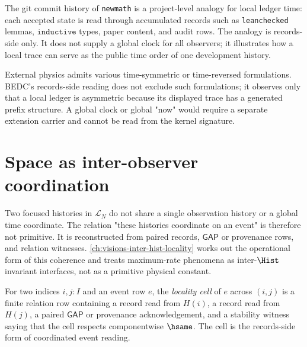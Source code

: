 \begin{example}
\label{ex:consciousness-universe-commit-history-time}
The git commit history of \texttt{newmath} is a project-level analogy for local ledger time: each accepted state is read through accumulated records such as \texttt{leanchecked} lemmas, $\texttt{inductive}$ types, paper content, and audit rows. The analogy is records-side only. It does not supply a global clock for all observers; it illustrates how a local trace can serve as the public time order of one development history.
\end{example}

\begin{remark}
\label{rem:consciousness-universe-time-one-direction}
External physics admits various time-symmetric or time-reversed formulations. BEDC's records-side reading does not exclude such formulations; it observes only that a local ledger is asymmetric because its displayed trace has a generated prefix structure. A global clock or global "now" would require a separate extension carrier and cannot be read from the kernel signature.
\end{remark}

\section{Space as inter-observer coordination}
\label{sec:consciousness-universe-space-as-coordination}

\begin{principle}
\label{prin:consciousness-universe-no-god-eye}
Two focused histories in $\mathcal{L}_N$ do not share a single observation history or a global time coordinate. The relation "these histories coordinate on an event" is therefore not primitive. It is reconstructed from paired records, $\mathsf{GAP}$ or provenance rows, and relation witnesses. \autoref{ch:visions-inter-hist-locality} works out the operational form of this coherence and treats maximum-rate phenomena as inter-$\Hist$ invariant interfaces, not as a primitive physical constant.
\end{principle}

\begin{definition}
\label{def:consciousness-universe-locality-cell}
For two indices $i,j:I$ and an event row $e$, the \emph{locality cell} of $e$ across $(i,j)$ is a finite relation row containing a record read from $H(i)$, a record read from $H(j)$, a paired $\mathsf{GAP}$ or provenance acknowledgement, and a stability witness saying that the cell respects componentwise $\hsame$. The cell is the records-side form of coordinated event reading.
\end{definition}


